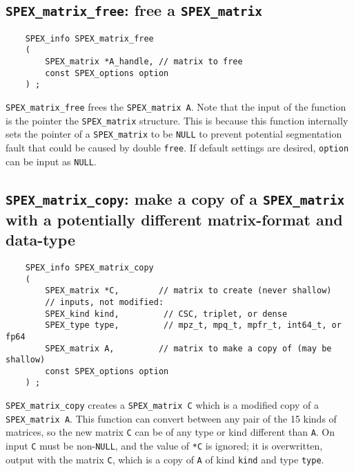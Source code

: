 \documentclass[12pt]{report}
\theoremstyle{definition}
\begin{document}
\cprotect\subsection{\verb|SPEX_matrix_free|: free a \verb|SPEX_matrix|}
\label{s:user:matrix_free}

\begin{mdframed}[userdefinedwidth=6in]
{\footnotesize
\begin{verbatim}
    SPEX_info SPEX_matrix_free
    (
        SPEX_matrix *A_handle, // matrix to free
        const SPEX_options option
    ) ;
\end{verbatim}
} \end{mdframed}

\verb|SPEX_matrix_free| frees the \verb|SPEX_matrix A|.  Note that the input
of the function is the pointer the \verb|SPEX_matrix|
structure. This is because this function internally sets the pointer of a
\verb|SPEX_matrix| to be \verb|NULL| to prevent potential segmentation fault
that could be caused by double \verb|free|.  If default settings are desired,
\verb|option| can be input as \verb|NULL|.

\cprotect\subsection{\verb|SPEX_matrix_copy|: make a copy of a \verb|SPEX_matrix| with a potentially different matrix-format and data-type}
\label{s:user:matrix_copy}

\begin{mdframed}[userdefinedwidth=6in]
{\footnotesize
\begin{verbatim}
    SPEX_info SPEX_matrix_copy
    (
        SPEX_matrix *C,        // matrix to create (never shallow)
        // inputs, not modified:
        SPEX_kind kind,         // CSC, triplet, or dense
        SPEX_type type,         // mpz_t, mpq_t, mpfr_t, int64_t, or fp64
        SPEX_matrix A,         // matrix to make a copy of (may be shallow)
        const SPEX_options option
    ) ;
\end{verbatim}
} \end{mdframed}

\verb|SPEX_matrix_copy| creates a \verb|SPEX_matrix C| which is a modified
copy of a \verb|SPEX_matrix A|. This function can convert between any pair of
the 15 kinds of matrices, so the new matrix \verb|C| can be of any type or kind
different than \verb|A|.  On input \verb|C| must be non-\verb|NULL|, and the
value of \verb|*C| is ignored; it is overwritten, output with the matrix
\verb|C|, which is a copy of \verb|A| of kind \verb|kind| and type \verb|type|.
\end{document}
